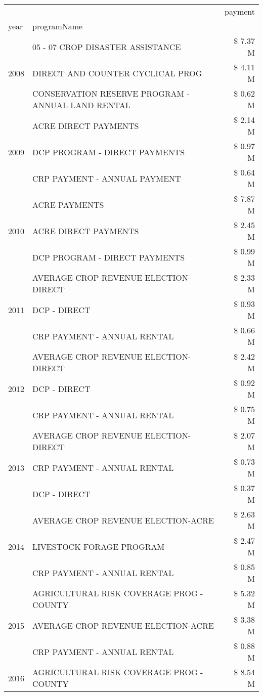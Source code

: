 \begin{tabular}{llr}
\toprule
 &  & payment \\
year & programName &  \\
\midrule
\multirow[t]{3}{*}{2008} & 05 - 07 CROP DISASTER ASSISTANCE & \$ 7.37 M \\
 & DIRECT AND COUNTER CYCLICAL PROG & \$ 4.11 M \\
 & CONSERVATION RESERVE PROGRAM - ANNUAL LAND RENTAL & \$ 0.62 M \\
\cline{1-3}
\multirow[t]{3}{*}{2009} & ACRE DIRECT PAYMENTS & \$ 2.14 M \\
 & DCP PROGRAM - DIRECT PAYMENTS & \$ 0.97 M \\
 & CRP PAYMENT - ANNUAL PAYMENT & \$ 0.64 M \\
\cline{1-3}
\multirow[t]{3}{*}{2010} & ACRE PAYMENTS & \$ 7.87 M \\
 & ACRE DIRECT PAYMENTS & \$ 2.45 M \\
 & DCP PROGRAM - DIRECT PAYMENTS & \$ 0.99 M \\
\cline{1-3}
\multirow[t]{3}{*}{2011} & AVERAGE CROP REVENUE ELECTION-DIRECT & \$ 2.33 M \\
 & DCP - DIRECT & \$ 0.93 M \\
 & CRP PAYMENT - ANNUAL RENTAL & \$ 0.66 M \\
\cline{1-3}
\multirow[t]{3}{*}{2012} & AVERAGE CROP REVENUE ELECTION-DIRECT & \$ 2.42 M \\
 & DCP - DIRECT & \$ 0.92 M \\
 & CRP PAYMENT - ANNUAL RENTAL & \$ 0.75 M \\
\cline{1-3}
\multirow[t]{3}{*}{2013} & AVERAGE CROP REVENUE ELECTION-DIRECT & \$ 2.07 M \\
 & CRP PAYMENT - ANNUAL RENTAL & \$ 0.73 M \\
 & DCP - DIRECT & \$ 0.37 M \\
\cline{1-3}
\multirow[t]{3}{*}{2014} & AVERAGE CROP REVENUE ELECTION-ACRE & \$ 2.63 M \\
 & LIVESTOCK FORAGE PROGRAM & \$ 2.47 M \\
 & CRP PAYMENT - ANNUAL RENTAL & \$ 0.85 M \\
\cline{1-3}
\multirow[t]{3}{*}{2015} & AGRICULTURAL RISK COVERAGE PROG - COUNTY & \$ 5.32 M \\
 & AVERAGE CROP REVENUE ELECTION-ACRE & \$ 3.38 M \\
 & CRP PAYMENT - ANNUAL RENTAL & \$ 0.88 M \\
\cline{1-3}
\multirow[t]{3}{*}{2016} & AGRICULTURAL RISK COVERAGE PROG - COUNTY & \$ 8.54 M \\

\end{tabular}
